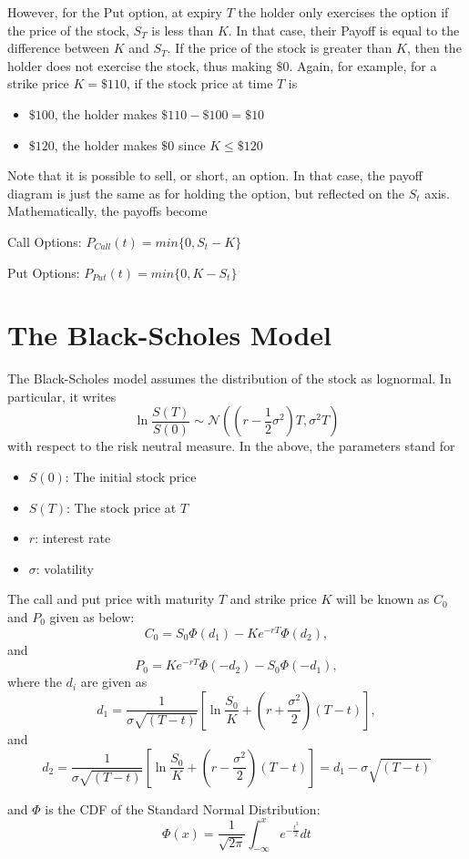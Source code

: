 \documentclass{report}
\begin{document}
However, for the Put option, at expiry $T$ the holder only exercises the option if the price of the stock, $S_T$ is less than $K$. In that case, their Payoff is equal to the difference between $K$ and $S_T$. If the price of the stock is greater than $K$, then the holder does not exercise the stock, thus making $\$0$. Again, for example, for a strike price $K=\$110$, if the stock price at time $T$ is 
\begin{itemize}
\item $\$100$, the holder makes $\$110-\$100=\$10$
\item $\$120$, the holder makes $\$0$ since $K\leq\$120$
\end{itemize}

Note that it is possible to sell, or short, an option. In that case, the payoff diagram is just the same as for holding the option, but reflected on the $S_t$ axis. Mathematically, the payoffs become

Call Options:
$P_{Call}(t)=min\{0, S_{t} - K\}$


Put Options:
$P_{Put}(t)=min\{0, K-S_{t}\}$

\section{The Black-Scholes Model}

The Black-Scholes model assumes the distribution of the stock as lognormal. In particular, it writes 
$$\ln \frac{S(T)}{S(0)} \sim \mathcal N((r  - \frac 1 2 \sigma^2) T, \sigma^2 T)$$
with respect to the risk neutral measure. In the above, the parameters stand for

\begin{itemize}
\item $S(0)$: The initial stock price
\item $S(T)$: The stock price at $T$
\item $r$: interest rate
\item $\sigma$: volatility
\end{itemize}

The call and put price with maturity $T$ and strike price $K$ will be known as $C_0$ and $P_0$ given as below:
$$C_0 = S_0  \Phi(d_1) - K e^{-rT} \Phi(d_2),$$
and 
$$P_0 = K e^{-rT} \Phi(- d_2) - S_0  \Phi(- d_1),$$
where the $d_i$ are given as
$$d_1 = \frac{1}{\sigma\sqrt{\left( T - t \right)}}
        \left[
          \ln\frac{S_{0}}{K}
          +
          \left(
            r + \frac{\sigma^2}{2}
          \right)
          \left(
            T-t
          \right)
        \right],$$
and
$$d_2 = \frac{1}{\sigma\sqrt{\left( T - t \right)}}
        \left[
          \ln\frac{S_{0}}{K}
          +
          \left(
            r - \frac{\sigma^2}{2}
          \right)
          \left(
            T-t
          \right)
        \right] = d_{1}-\sigma\sqrt{\left( T - t \right)}$$

and $\Phi$ is the CDF of the Standard Normal Distribution:
$$\Phi(x)=\frac{1}{\sqrt{2\pi}}\int_{-\infty}^{x}e^{-\frac{t^2}{2}}dt$$
\end{document}
